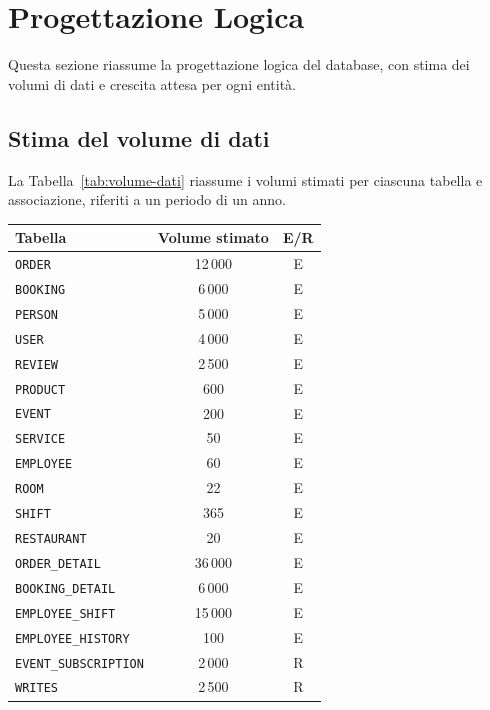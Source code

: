 \documentclass[a4paper,12pt]{report}
\begin{document}
\newpage
\chapter{Progettazione Logica}
Questa sezione riassume la progettazione logica del database, con
stima dei volumi di dati e crescita attesa per ogni entità.

\section{Stima del volume di dati }
La Tabella~\ref{tab:volume-dati} riassume i volumi stimati per
ciascuna tabella e associazione, riferiti a un periodo di un anno.

\begin{table}[H]
  \centering
  \begin{tabularx}{\textwidth}{|X|c|c|}
    \hline
    \rowcolor{gray!15}
    \textbf{Tabella} & \textbf{Volume stimato} & \textbf{E/R} \\
    \hline
    \texttt{ORDER}               & 12\,000  & E \\
    \texttt{BOOKING}             & 6\,000   & E \\
    \texttt{PERSON}              & 5\,000   & E \\
    \texttt{USER}                & 4\,000   & E \\
    \texttt{REVIEW}              & 2\,500   & E \\
    \texttt{PRODUCT}             & 600      & E \\
    \texttt{EVENT}               & 200      & E \\
    \texttt{SERVICE}             & 50       & E \\
    \texttt{EMPLOYEE}            & 60       & E \\
    \texttt{ROOM}                & 22       & E \\
    \texttt{SHIFT}               & 365      & E \\
    \texttt{RESTAURANT}          & 20       & E \\
    \texttt{ORDER\_DETAIL}       & 36\,000  & E \\
    \texttt{BOOKING\_DETAIL}     & 6\,000   & E \\
    \texttt{EMPLOYEE\_SHIFT}     & 15\,000  & E \\
    \texttt{EMPLOYEE\_HISTORY}   & 100      & E \\
    \hline
    \texttt{EVENT\_SUBSCRIPTION}  & 2\,000   & R \\
    \texttt{WRITES}              & 2\,500   & R \\

\end{tabularx}
\end{table}
\end{document}
